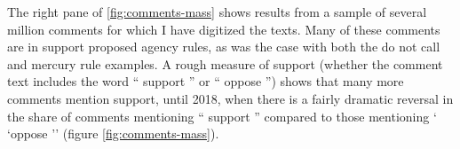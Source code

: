 The right pane of \ref{fig:comments-mass} shows results from a sample of several million comments for which I have digitized the texts. Many of these comments are in support proposed agency rules, as was the case with both the do not call and mercury rule examples. A rough measure of support (whether the comment text includes the word `` support '' or `` oppose '') shows that many more comments mention support, until 2018, when there is a fairly dramatic reversal in the share of comments mentioning `` support '' compared to those mentioning ` `oppose '' (figure \ref{fig:comments-mass}). 




